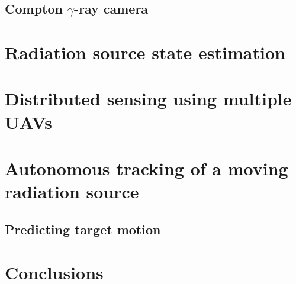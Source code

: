 \documentclass[a4paper,12pt,titlepage, twoside]{article}
\begin{document}


\subsection{Compton $\gamma$-ray camera}




\section{Radiation source state estimation}



\section{Distributed sensing using multiple UAVs}



\section{Autonomous tracking of a moving radiation source}

\subsection{Predicting target motion}



\section{Conclusions}




\clearpage
{}
\cleardoublepage

\clearpage




\end{document}
